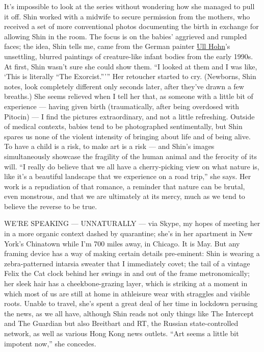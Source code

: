 It's impossible to look at the series without wondering how she managed
to pull it off. Shin worked with a midwife to secure permission from the
mothers, who received a set of more conventional photos documenting the
birth in exchange for allowing Shin in the room. The focus is on the
babies' aggrieved and rumpled faces; the idea, Shin tells me, came from
the German painter \href{https://www.frieze.com/article/still-lives}{Ull
Hohn}'s unsettling, blurred paintings of creature-like infant bodies
from the early 1990s. At first, Shin wasn't sure she could show them.
``I looked at them and I was like, `This is literally ``The
Exorcist.''''' Her retoucher started to cry. (Newborns, Shin notes, look
completely different only seconds later, after they've drawn a few
breaths.) She seems relieved when I tell her that, as someone with a
little bit of experience --- having given birth (traumatically, after
being overdosed with Pitocin) --- I find the pictures extraordinary, and
not a little refreshing. Outside of medical contexts, babies tend to be
photographed sentimentally, but Shin spares us none of the violent
intensity of bringing about life and of being alive. To have a child is
a risk, to make art is a risk --- and Shin's images simultaneously
showcase the fragility of the human animal and the ferocity of its will.
``I really do believe that we all have a cherry-picking view on what
nature is, like it's a beautiful landscape that we experience on a road
trip,'' she says. Her work is a repudiation of that romance, a reminder
that nature can be brutal, even monstrous, and that we are ultimately at
its mercy, much as we tend to believe the reverse to be true.

WE'RE SPEAKING --- UNNATURALLY --- via Skype, my hopes of meeting her in
a more organic context dashed by quarantine; she's in her apartment in
New York's Chinatown while I'm 700 miles away, in Chicago. It is May.
But any framing device has a way of making certain details pre-eminent:
Shin is wearing a zebra-patterned intarsia sweater that I immediately
covet; the tail of a vintage Felix the Cat clock behind her swings in
and out of the frame metronomically; her sleek hair has a
cheekbone-grazing layer, which is striking at a moment in which most of
us are still at home in athleisure wear with straggles and visible
roots. Unable to travel, she's spent a great deal of her time in
lockdown perusing the news, as we all have, although Shin reads not only
things like The Intercept and The Guardian but also Breitbart and RT,
the Russian state-controlled network, as well as various Hong Kong news
outlets. ``Art seems a little bit impotent now,'' she concedes.

